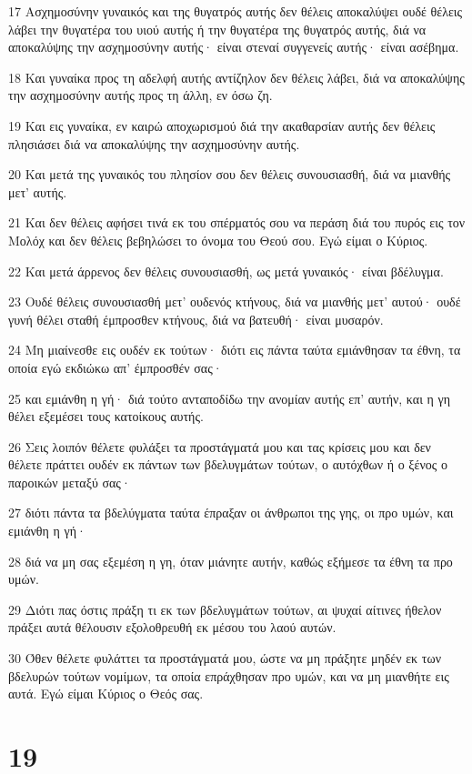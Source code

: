 \par 17 Ασχημοσύνην γυναικός και της θυγατρός αυτής δεν θέλεις αποκαλύψει ουδέ θέλεις λάβει την θυγατέρα του υιού αυτής ή την θυγατέρα της θυγατρός αυτής, διά να αποκαλύψης την ασχημοσύνην αυτής· είναι στεναί συγγενείς αυτής· είναι ασέβημα.
\par 18 Και γυναίκα προς τη αδελφή αυτής αντίζηλον δεν θέλεις λάβει, διά να αποκαλύψης την ασχημοσύνην αυτής προς τη άλλη, εν όσω ζη.
\par 19 Και εις γυναίκα, εν καιρώ αποχωρισμού διά την ακαθαρσίαν αυτής δεν θέλεις πλησιάσει διά να αποκαλύψης την ασχημοσύνην αυτής.
\par 20 Και μετά της γυναικός του πλησίον σου δεν θέλεις συνουσιασθή, διά να μιανθής μετ' αυτής.
\par 21 Και δεν θέλεις αφήσει τινά εκ του σπέρματός σου να περάση διά του πυρός εις τον Μολόχ και δεν θέλεις βεβηλώσει το όνομα του Θεού σου. Εγώ είμαι ο Κύριος.
\par 22 Και μετά άρρενος δεν θέλεις συνουσιασθή, ως μετά γυναικός· είναι βδέλυγμα.
\par 23 Ουδέ θέλεις συνουσιασθή μετ' ουδενός κτήνους, διά να μιανθής μετ' αυτού· ουδέ γυνή θέλει σταθή έμπροσθεν κτήνους, διά να βατευθή· είναι μυσαρόν.
\par 24 Μη μιαίνεσθε εις ουδέν εκ τούτων· διότι εις πάντα ταύτα εμιάνθησαν τα έθνη, τα οποία εγώ εκδιώκω απ' έμπροσθέν σας·
\par 25 και εμιάνθη η γή· διά τούτο ανταποδίδω την ανομίαν αυτής επ' αυτήν, και η γη θέλει εξεμέσει τους κατοίκους αυτής.
\par 26 Σεις λοιπόν θέλετε φυλάξει τα προστάγματά μου και τας κρίσεις μου και δεν θέλετε πράττει ουδέν εκ πάντων των βδελυγμάτων τούτων, ο αυτόχθων ή ο ξένος ο παροικών μεταξύ σας·
\par 27 διότι πάντα τα βδελύγματα ταύτα έπραξαν οι άνθρωποι της γης, οι προ υμών, και εμιάνθη η γή·
\par 28 διά να μη σας εξεμέση η γη, όταν μιάνητε αυτήν, καθώς εξήμεσε τα έθνη τα προ υμών.
\par 29 Διότι πας όστις πράξη τι εκ των βδελυγμάτων τούτων, αι ψυχαί αίτινες ήθελον πράξει αυτά θέλουσιν εξολοθρευθή εκ μέσου του λαού αυτών.
\par 30 Όθεν θέλετε φυλάττει τα προστάγματά μου, ώστε να μη πράξητε μηδέν εκ των βδελυρών τούτων νομίμων, τα οποία επράχθησαν προ υμών, και να μη μιανθήτε εις αυτά. Εγώ είμαι Κύριος ο Θεός σας.

\chapter{19}


